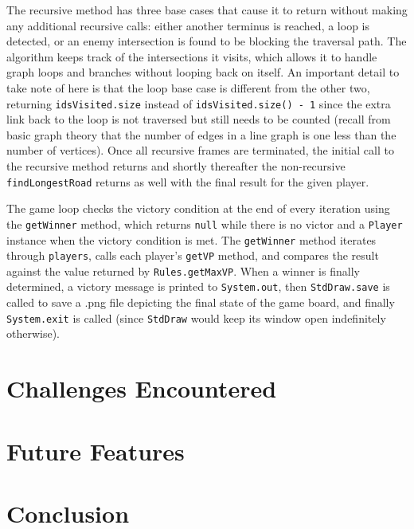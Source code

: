 \documentclass[pageno]{jpaper}
\begin{document}
\begin{doublespacing}
The recursive method has three base cases that cause it to return without making any additional recursive calls: either another terminus is reached, a loop is detected, or an enemy intersection is found to be blocking the traversal path. The algorithm keeps track of the intersections it visits, which allows it to handle graph loops and branches without looping back on itself. An important detail to take note of here is that the loop base case is different from the other two, returning \lstinline$idsVisited.size$ instead of \lstinline$idsVisited.size() - 1$ since the extra link back to the loop is not traversed but still needs to be counted (recall from basic graph theory that the number of edges in a line graph is one less than the number of vertices). Once all recursive frames are terminated, the initial call to the recursive method returns and shortly thereafter the non-recursive \lstinline$findLongestRoad$ returns as well with the final result for the given player.

The game loop checks the victory condition at the end of every iteration using the \lstinline$getWinner$ method, which returns \lstinline$null$ while there is no victor and a \lstinline$Player$ instance when the victory condition is met. The \lstinline$getWinner$ method iterates through \lstinline$players$, calls each player's \lstinline$getVP$ method, and compares the result against the value returned by \lstinline$Rules.getMaxVP$. When a winner is finally determined, a victory message is printed to \lstinline$System.out$, then \lstinline$StdDraw.save$ is called to save a .png file depicting the final state of the game board, and finally \lstinline$System.exit$ is called (since \lstinline$StdDraw$ would keep its window open indefinitely otherwise).

\hypertarget{sec:challenges_encountered}{}
\section{Challenges Encountered}



\hypertarget{sec:future_features}{}
\section{Future Features}


\hypertarget{sec:conclusion}{}
\section{Conclusion}

\end{doublespacing} 


\end{document}
